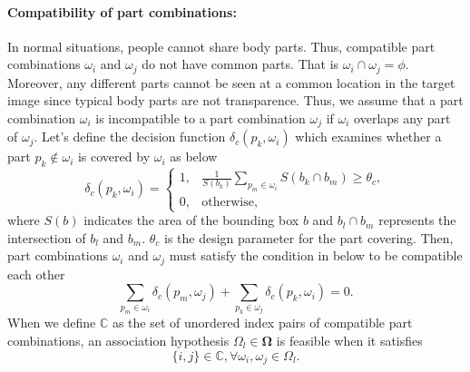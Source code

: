 \documentclass[runningheads]{llncs}
\begin{document}
\paragraph{Compatibility of part combinations:} 
In normal situations, people cannot share body parts.
Thus, compatible part combinations $\omega_i$ and $\omega_j$ do not have common parts. 
That is $\omega_i \cap \omega_j = \phi$.
Moreover, any different parts cannot be seen at a common location in the target image since typical body parts are not transparence.
Thus, we assume that a part combination $\omega_i$ is incompatible to a part combination $\omega_j$ if $\omega_i$ overlaps any part of $\omega_j$.
Let's define the decision function $\delta_c (p_k, \omega_i)$ which examines whether a part $p_k \notin  \omega_i$ is covered by $\omega_i$ as below
\begin{equation}
   \label{eq:part_occluion}
   \delta_c (p_k, \omega_i) = \begin{cases}
      1, &\frac{1}{S(b_k)} \sum_{p_m \in \omega_i} S(b_k \cap b_m) \geq \theta_{c},\\
      0, &\mathrm{otherwise},
   \end{cases}
\end{equation}
where $S(b)$ indicates the area of the bounding box $b$ and $b_l \cap b_m$ represents the intersection of $b_l$ and $b_m$. $\theta_{c}$ is the design parameter for the part covering. 
Then, part combinations $\omega_i$ and $\omega_j$ must satisfy the condition in below to be compatible each other
\begin{equation}
   \label{eq:compatible_overlap}
   \sum_{p_m \in \omega_i} \delta_c(p_m,\omega_j) + \sum_{p_k \in \omega_j} \delta_c(p_k,\omega_i) = 0.
\end{equation}
When we define $\mathbb{C}$ as the set of unordered index pairs of compatible part combinations, an association hypothesis $\Omega_l \in \mathbf{\Omega}$ is feasible when it satisfies
\begin{equation}
   \label{eq:feasible_association_hypothesis}
   \{i,j\} \in \mathbb{C}, \forall \omega_i,\omega_j \in \Omega_l.
\end{equation}
\end{document}
